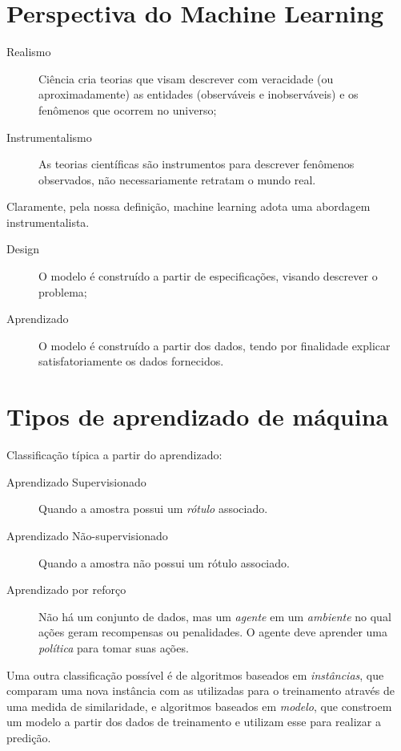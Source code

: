 \section*{Perspectiva do Machine Learning}

\begin{description}
    \item[Realismo] Ciência cria teorias que visam descrever com veracidade (ou aproximadamente) as entidades (observáveis e inobserváveis) e os fenômenos que ocorrem no universo;
    \item[Instrumentalismo] As teorias científicas são instrumentos para descrever fenômenos observados, não necessariamente retratam o mundo real.
\end{description}

Claramente, pela nossa definição, machine learning adota uma abordagem instrumentalista.

\begin{description}
    \item[Design] O modelo é construído a partir de especificações, visando descrever o problema;
    \item[Aprendizado] O modelo é construído a partir dos dados, tendo por finalidade explicar satisfatoriamente os dados fornecidos.
\end{description}

\section*{Tipos de aprendizado de máquina}

Classificação típica a partir do aprendizado:
\begin{description}
    \item[Aprendizado Supervisionado] Quando a amostra possui um \emph{rótulo} associado.
    \item[Aprendizado Não-supervisionado] Quando a amostra não possui um rótulo associado.
    \item[Aprendizado por reforço] Não há um conjunto de dados, mas um \emph{agente} em um \emph{ambiente} no qual ações geram recompensas ou penalidades. O agente deve aprender uma \emph{política} para tomar suas ações.
\end{description}

Uma outra classificação possível é de algoritmos baseados em \emph{instâncias}, que comparam uma nova instância com as utilizadas para o treinamento através de uma medida de similaridade, e algoritmos baseados em \emph{modelo}, que constroem um modelo a partir dos dados de treinamento e utilizam esse para realizar a predição.

